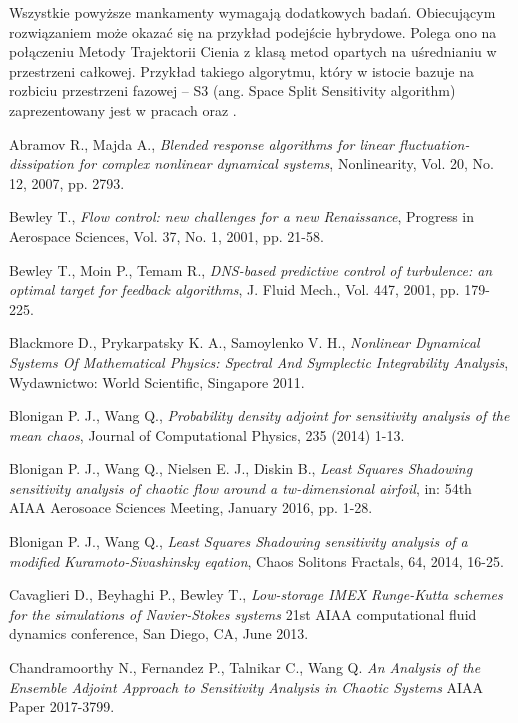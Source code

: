 \documentclass[12pt]{article}
\begin{document}
Wszystkie powyższe mankamenty wymagają dodatkowych badań. Obiecującym rozwiązaniem może okazać się na przykład podejście hybrydowe. Polega ono na połączeniu Metody Trajektorii Cienia z klasą metod opartych na uśrednianiu w przestrzeni całkowej. Przykład takiego algorytmu, który w istocie bazuje na rozbiciu przestrzeni fazowej – S3 (ang. Space Split Sensitivity algorithm) zaprezentowany jest w pracach \cite{Chandramoorthy2} oraz \cite{Chandramoorthy3}.
	  
\newpage
\begin{thebibliography}{99}

 Abramov R., Majda A.,
\emph{Blended response algorithms for linear fluctuation-dissipation for complex nonlinear dynamical systems},
Nonlinearity, Vol. 20, No. 12, 2007, pp. 2793.
	
 Bewley T.,
\emph{Flow control: new challenges for a new Renaissance},
Progress in Aerospace Sciences, Vol. 37, No. 1, 2001, pp. 21-58.

 Bewley T., Moin P., Temam R.,
\emph{DNS-based predictive control of turbulence: an optimal target for feedback algorithms},
J. Fluid Mech., Vol. 447, 2001, pp. 179-225.

 Blackmore D., Prykarpatsky K. A., Samoylenko V. H.,
\emph{Nonlinear Dynamical Systems Of Mathematical Physics: Spectral And Symplectic Integrability Analysis},
Wydawnictwo: World Scientific, Singapore 2011.

 Blonigan P. J., Wang Q.,
\emph{Probability density adjoint for sensitivity analysis of the mean chaos},
Journal of Computational Physics, 235 (2014) 1-13.

 Blonigan P. J., Wang Q., Nielsen E. J., Diskin B.,
\emph{Least Squares Shadowing sensitivity analysis of chaotic flow around a tw-dimensional airfoil},
in: 54th AIAA Aerosoace Sciences Meeting, January 2016, pp. 1-28.

 Blonigan P. J., Wang Q.,
\emph{Least Squares Shadowing sensitivity analysis of a modified Kuramoto-Sivashinsky eqation},
Chaos Solitons Fractals, 64, 2014, 16-25.

 Cavaglieri D., Beyhaghi P., Bewley T.,  
\emph{Low-storage IMEX Runge-Kutta schemes for the simulations of Navier-Stokes systems} 
21st AIAA computational fluid dynamics conference, San Diego, CA, June 2013.

 Chandramoorthy N., Fernandez P., Talnikar C., Wang Q. 
\emph{An Analysis of the Ensemble Adjoint Approach to Sensitivity Analysis in Chaotic Systems} 
AIAA Paper 2017-3799. 


\end{thebibliography}
\end{document}
